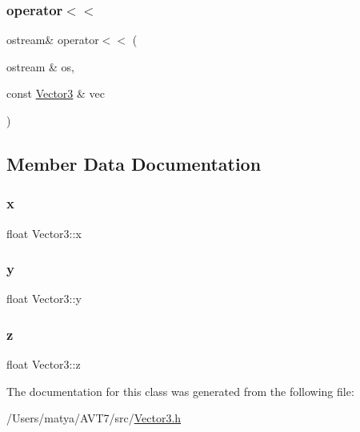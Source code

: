 \subsubsection{\texorpdfstring{operator$<$$<$}{operator<<}}
{\footnotesize\ttfamily ostream\& operator$<$$<$ (\begin{DoxyParamCaption}\item[{ostream \&}]{os,  }\item[{const \hyperlink{class_vector3}{Vector3} \&}]{vec }\end{DoxyParamCaption})\hspace{0.3cm}{\ttfamily [friend]}}



\subsection{Member Data Documentation}
\mbox{\label{class_vector3_a7e2d3237b29a2f29d7b3d8b2934e35f2}} 
\subsubsection{\texorpdfstring{x}{x}}
{\footnotesize\ttfamily float Vector3\+::x}

\mbox{\label{class_vector3_a86eb35a9fa2d5a49e7fad66a35fa9c13}} 
\subsubsection{\texorpdfstring{y}{y}}
{\footnotesize\ttfamily float Vector3\+::y}

\mbox{\label{class_vector3_aa8c9461eb24bd2c364258078811a3e9d}} 
\subsubsection{\texorpdfstring{z}{z}}
{\footnotesize\ttfamily float Vector3\+::z}



The documentation for this class was generated from the following file\+:\begin{DoxyCompactItemize}
\item 
/\+Users/matya/\+A\+V\+T7/src/\hyperlink{_vector3_8h}{Vector3.\+h}\end{DoxyCompactItemize}
